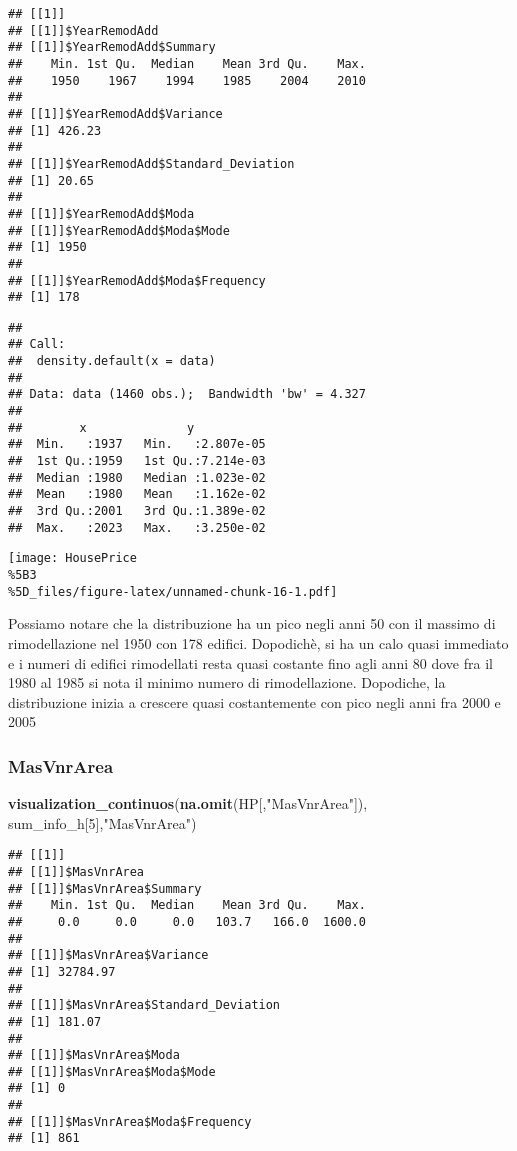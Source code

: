 \documentclass[
]{article}
\newenvironment{Shaded}{\begin{snugshade}}{\end{snugshade}}
\newcommand{\DecValTok}[1]{\textcolor[rgb]{0.00,0.00,0.81}{#1}}
\newcommand{\FunctionTok}[1]{\textcolor[rgb]{0.13,0.29,0.53}{\textbf{#1}}}
\newcommand{\NormalTok}[1]{#1}
\newcommand{\StringTok}[1]{\textcolor[rgb]{0.31,0.60,0.02}{#1}}
\begin{document}
\begin{verbatim}
## [[1]]
## [[1]]$YearRemodAdd
## [[1]]$YearRemodAdd$Summary
##    Min. 1st Qu.  Median    Mean 3rd Qu.    Max. 
##    1950    1967    1994    1985    2004    2010 
## 
## [[1]]$YearRemodAdd$Variance
## [1] 426.23
## 
## [[1]]$YearRemodAdd$Standard_Deviation
## [1] 20.65
## 
## [[1]]$YearRemodAdd$Moda
## [[1]]$YearRemodAdd$Moda$Mode
## [1] 1950
## 
## [[1]]$YearRemodAdd$Moda$Frequency
## [1] 178
\end{verbatim}

\begin{verbatim}
## 
## Call:
##  density.default(x = data)
## 
## Data: data (1460 obs.);  Bandwidth 'bw' = 4.327
## 
##        x              y            
##  Min.   :1937   Min.   :2.807e-05  
##  1st Qu.:1959   1st Qu.:7.214e-03  
##  Median :1980   Median :1.023e-02  
##  Mean   :1980   Mean   :1.162e-02  
##  3rd Qu.:2001   3rd Qu.:1.389e-02  
##  Max.   :2023   Max.   :3.250e-02
\end{verbatim}

\texttt{[image: HousePrice\\\%5B3\\\%5D\_files/figure-latex/unnamed-chunk-16-1.pdf]}

Possiamo notare che la distribuzione ha un pico negli anni 50 con il
massimo di rimodellazione nel 1950 con 178 edifici. Dopodichè, si ha un
calo quasi immediato e i numeri di edifici rimodellati resta quasi
costante fino agli anni 80 dove fra il 1980 al 1985 si nota il minimo
numero di rimodellazione. Dopodiche, la distribuzione inizia a crescere
quasi costantemente con pico negli anni fra 2000 e 2005

\subsubsection{MasVnrArea}\label{masvnrarea}

\begin{Shaded}
\begin{Highlighting}[]
\FunctionTok{visualization\_continuos}\NormalTok{(}\FunctionTok{na.omit}\NormalTok{(HP[,}\StringTok{"MasVnrArea"}\NormalTok{]), sum\_info\_h[}\DecValTok{5}\NormalTok{],}\StringTok{"MasVnrArea"}\NormalTok{)}
\end{Highlighting}
\end{Shaded}

\begin{verbatim}
## [[1]]
## [[1]]$MasVnrArea
## [[1]]$MasVnrArea$Summary
##    Min. 1st Qu.  Median    Mean 3rd Qu.    Max. 
##     0.0     0.0     0.0   103.7   166.0  1600.0 
## 
## [[1]]$MasVnrArea$Variance
## [1] 32784.97
## 
## [[1]]$MasVnrArea$Standard_Deviation
## [1] 181.07
## 
## [[1]]$MasVnrArea$Moda
## [[1]]$MasVnrArea$Moda$Mode
## [1] 0
## 
## [[1]]$MasVnrArea$Moda$Frequency
## [1] 861
\end{verbatim}
\end{document}
